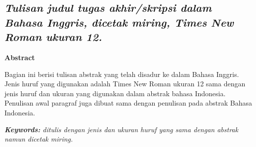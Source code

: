 \begin{singlespace}
\chapter*{\large \textit{Tulisan judul tugas akhir/skripsi dalam Bahasa Inggris, dicetak miring, Times New Roman ukuran 12.}}

\begin{center}
    \textbf{Abstract}
\end{center}
Bagian ini berisi tulisan abstrak yang telah disadur ke dalam Bahasa Inggris. Jenis huruf yang digunakan adalah Times New Roman ukuran 12 sama dengan jenis huruf dan ukuran yang digunakan dalam abstrak bahasa Indonesia. Penulisan awal paragraf juga dibuat sama dengan penulisan pada abstrak Bahasa Indonesia.

\vspace{0.5cm}
\noindent \textit{\textbf{Keywords:} ditulis dengan jenis dan ukuran huruf yang sama dengan abstrak namun dicetak miring.}
\end{singlespace}

